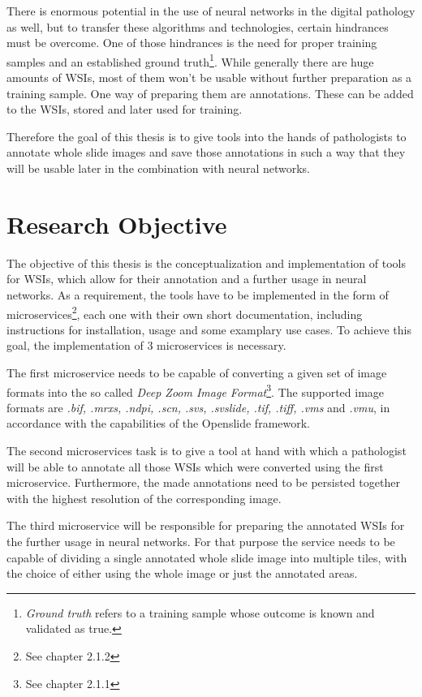 There is enormous potential in the use of neural networks in the digital pathology as well, but to transfer these algorithms and technologies, certain hindrances must be overcome. One of those hindrances is the need for proper training samples and an established ground truth\footnote{\emph{Ground truth} refers to a training sample whose outcome is known and validated as true.}. While generally there are huge amounts of WSIs, most of them won't be usable without further preparation as a training sample. One way of preparing them are annotations. These can be added to the WSIs, stored and later used for training.

Therefore the goal of this thesis is to give tools into the hands of pathologists to annotate whole slide images and save those annotations in such a way that they will be usable later in the combination with neural networks.


\section{Research Objective}
The objective of this thesis is the conceptualization and implementation of tools for WSIs, which allow for their annotation and a further usage in neural networks. As a requirement, the tools have to be implemented in the form of microservices\footnote{See chapter 2.1.2}, each one with their own short documentation, including instructions for installation, usage and some examplary use cases. To achieve this goal, the implementation of 3 microservices is necessary.

The first microservice needs to be capable of converting a given set of image formats into the so called \emph{Deep Zoom Image Format}\footnote{See chapter 2.1.1}. The supported image formats are \emph{.bif, .mrxs, .ndpi, .scn, .svs, .svslide, .tif, .tiff, .vms} and \emph{.vmu}, in accordance with the capabilities of the Openslide framework\cite{Goode13}.

The second microservices task is to give a tool at hand with which a pathologist will be able to annotate all those WSIs which were converted using the first microservice. Furthermore, the made annotations need to be persisted together with the highest resolution of the corresponding image.

The third microservice will be responsible for preparing the annotated WSIs for the further usage in neural networks. For that purpose the service needs to be capable of dividing a single annotated whole slide image into multiple tiles, with the choice of either using the whole image or just the annotated areas.



